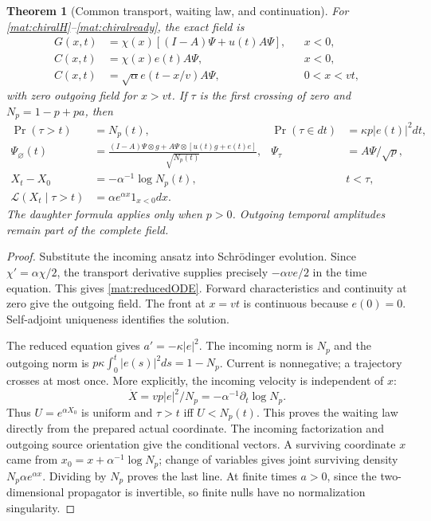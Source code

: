 \documentclass[11pt,oneside,openany]{book}
\newtheorem{theorem}{Theorem}[chapter]
\theoremstyle{definition}
\theoremstyle{remark}\newtheorem{remark}[theorem]{Remark}
\begin{document}
\begin{theorem}[Common transport, waiting law, and continuation]
\label{mat:common}
For \eqref{mat:chiralH}--\eqref{mat:chiralready}, the exact field is
\begin{align}
 G(x,t)&=\chi(x)[(I-A)\Psi+u(t)A\Psi],&&x<0,\\
 C(x,t)&=\chi(x)e(t)A\Psi,&&x<0,\\
 C(x,t)&=\sqrt\alpha e(t-x/v)A\Psi,&&0<x<vt,
 \label{mat:exactfield}
\end{align}
with zero outgoing field for $x>vt$. If $\tau$ is the first crossing of zero and $N_p=1-p+pa$, then
\begin{align}
 \Pr(\tau>t)&=N_p(t),&\Pr(\tau\in dt)&=\kappa p|e(t)|^2dt,\\
 \Psi_\varnothing(t)&=\frac{(I-A)\Psi\otimes g+
          A\Psi\otimes[u(t)g+e(t)e]}{\sqrt{N_p(t)}},
 &\Psi_\tau&=A\Psi/\sqrt p,\\
 X_t-X_0&=-\alpha^{-1}\log N_p(t),&&t<\tau,\\
 \mathcal L(X_t\mid\tau>t)&=\alpha e^{\alpha x}1_{x<0}dx.
 \label{mat:commonlaw}
\end{align}
The daughter formula applies only when $p>0$. Outgoing temporal amplitudes remain part of the complete field.
\end{theorem}
\begin{proof}
Substitute the incoming ansatz into Schr\"odinger evolution. Since $\chi'=\alpha\chi/2$, the transport derivative supplies precisely $-\alpha ve/2$ in the time equation. This gives \eqref{mat:reducedODE}. Forward characteristics and continuity at zero give the outgoing field. The front at $x=vt$ is continuous because $e(0)=0$. Self-adjoint uniqueness identifies the solution.

The reduced equation gives $a'=-\kappa|e|^2$. The incoming norm is $N_p$ and the outgoing norm is $p\kappa\int_0^t|e(s)|^2ds=1-N_p$. Current is nonnegative; a trajectory crosses at most once. More explicitly, the incoming velocity is independent of $x$:
\[
 \dot X=vp|e|^2/N_p=-\alpha^{-1}\partial_t\log N_p.
\]
Thus $U=e^{\alpha X_0}$ is uniform and $\tau>t$ iff $U<N_p(t)$. This proves the waiting law directly from the prepared actual coordinate. The incoming factorization and outgoing source orientation give the conditional vectors. A surviving coordinate $x$ came from $x_0=x+\alpha^{-1}\log N_p$; change of variables gives joint surviving density $N_p\alpha e^{\alpha x}$. Dividing by $N_p$ proves the last line. At finite times $a>0$, since the two-dimensional propagator is invertible, so finite nulls have no normalization singularity.
\end{proof}
\end{document}
